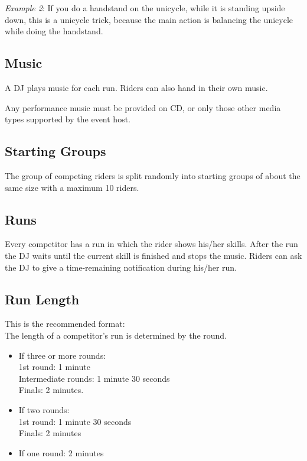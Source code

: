 \emph{Example 2}: If you do a handstand on the unicycle, while it is standing upside down, this is a unicycle trick, because the main action is balancing the unicycle while doing the handstand.

\subsection{Music}

A DJ plays music for each run.
Riders can also hand in their own music.

Any performance music must be provided on CD, or only those other media types supported by the event host.

\subsection{Starting Groups}
The group of competing riders is split randomly into starting groups of about the same size with a maximum 10 riders.

\subsection{Runs}

Every competitor has a run in which the rider shows his/her skills.
After the run the DJ waits until the current skill is finished and stops the music.
Riders can ask the DJ to give a time-remaining notification during his/her run.

\subsection{Run Length}

This is the recommended format: \\
The length of a competitor's run is determined by the round.
\begin{itemize}
\item If three or more rounds: \\
1st round: 1 minute \\
Intermediate rounds: 1 minute 30 seconds \\
Finals: 2 minutes.
\item If two rounds: \\
1st round: 1 minute 30 seconds \\
Finals: 2 minutes
\item If one round: 2 minutes
\end{itemize}


